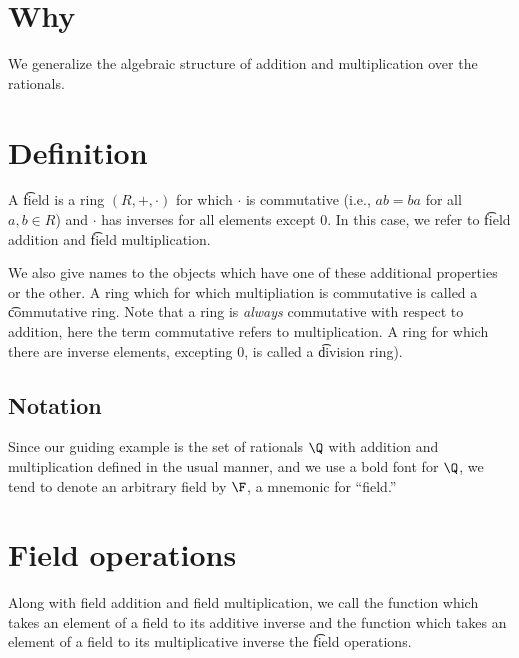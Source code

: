 
\section*{Why}

We generalize the algebraic structure of addition and multiplication over the rationals.

\section*{Definition}

A \t{field} is a ring $(R, +, \cdot  )$ for which $\cdot  $ is commutative (i.e., $ab = ba$ for all $a, b \in R$) and $\cdot  $ has inverses for all elements except $0$.
In this case, we refer to \t{field addition} and \t{field multiplication}.

We also give names to the objects which have one of these additional properties or the other.
A ring which for which multipliation is commutative is called a \t{commutative ring}.
Note that a ring is \textit{always} commutative with respect to addition, here the term commutative refers to multiplication.
A ring for which there are inverse elements, excepting 0, is called a \t{division ring}).

\subsection*{Notation}

Since our guiding example is the set of rationals $\Q  $ with addition and multiplication defined in the usual manner, and we use a bold font for $\Q  $, we tend to denote an arbitrary field by $\F  $, a mnemonic for ``field.''

\section*{Field operations}

Along with field addition and field multiplication, we call the function which takes an element of a field to its additive inverse and the function which takes an element of a field to its multiplicative inverse the \t{field operations}.
\blankpage
